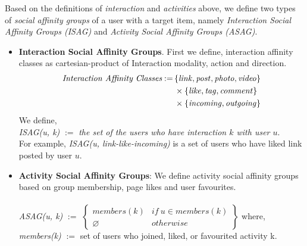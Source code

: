 Based on the definitions of {\em interaction}  and {\em activities} above, 
we define two types of {\em social affinity groups} of a user with a target item,
namely \textit{Interaction  Social Affinity Groups (ISAG)} and \textit{Activity Social Affinity Groups (ASAG)}.

\begin{itemize}
  \item \textbf{Interaction  Social Affinity Groups}. First we define, interaction affinity classes as cartesian-product of 
  Interaction modality, action and direction.
  \begin{align*}
  	\textit{Interaction Affinity Classes} := \, & \{\link, \post, \photo, \video\} \\
                                                & \times \{\like, \ttag, \comment\} \\
                                                & \times \{\incoming, \outgoing\}
  \end{align*}
  We define,\\
  \textit{ISAG(u, k)} $:=$ \textit{the set of the users who have interaction $k$ with user $u$}.\\
   For example,
   \textit{ISAG(u, link-like-incoming)}  is a set of users who have liked link posted by user $u$.
\item \textbf{Activity Social Affinity Groups}: We define activity social affinity groups based on group membership, page likes and user favourites.\\ \\
	\textit{ASAG(u, k)} $:=$
							\begin{math} 
							\begin{Bmatrix}
								members(k) & if\ u \in members(k)\\ 	
								\varnothing & otherwise
							\end{Bmatrix}
							\end{math}
	where, 	\textit{members(k)} $:=$ set of users who joined, liked, or favourited activity k.		
\end{itemize}


